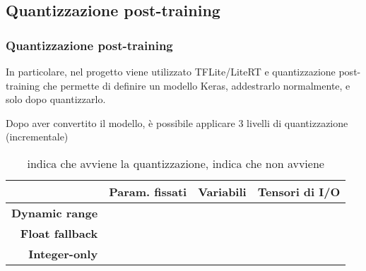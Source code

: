 \documentclass{beamer}
\newcommand{\dflvspace}{\vspace{10pt}}
\newcommand{\nocross}{{\color{red} \ding{55}}}
\newcommand{\okmark}{{\color{softgreen} \ding{51}}}
\begin{document}
\subsection{Quantizzazione post-training}
\begin{frame}
	\frametitle{Quantizzazione post-training}
	
	In particolare, nel progetto viene utilizzato TFLite/LiteRT e
	quantizzazione post-training che permette di definire un modello Keras, 
	addestrarlo normalmente, e solo dopo quantizzarlo.
	
	\dflvspace
	
	Dopo aver convertito il modello, è possibile applicare 
	3 livelli di quantizzazione (incrementale)
	
	\dflvspace
	
	\begin{center}
	\begin{table}
	\begin{tabular}{|r|c|c|c|}
	\hline
	& \textbf{Param. fissati} & \textbf{Variabili} & \textbf{Tensori di I/O} \\
	\hline
	\hline
	\textbf{Dynamic range} & \okmark & \nocross & \nocross \\
	\hline
	\textbf{Float fallback} & \okmark & \okmark & \nocross \\
	\hline
	\textbf{Integer-only} & \okmark & \okmark & \okmark \\
	\hline
	\end{tabular}
	\caption{\okmark\;indica che avviene la quantizzazione, \nocross\;indica che non avviene}
	\end{table}
	\end{center}
	
\end{frame}
\end{document}
